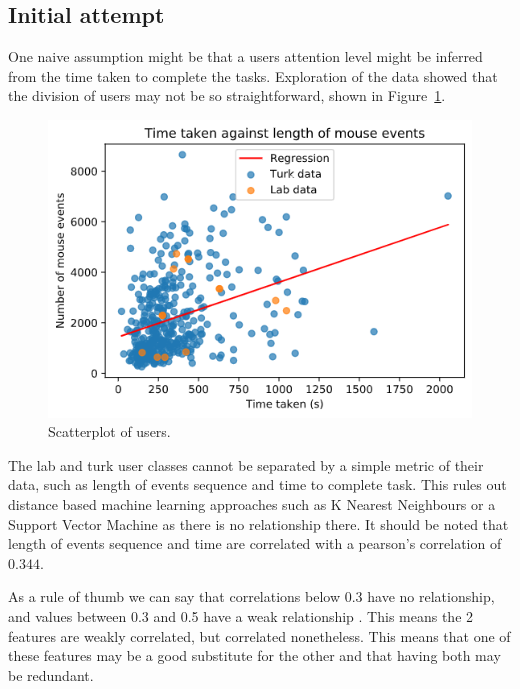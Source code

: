 \documentclass{article}
\begin{document}
\subsection{Initial attempt}

One naive assumption might be that a users attention level might be inferred from the time taken to complete the tasks.
Exploration of the data showed that the division of users may not be so straightforward, shown in Figure~\ref{fig:scatterplot}.

\begin{figure}[ht]
    \centering
    \includegraphics[scale=0.6]{Images/TimeTaken-Mouse-Events.png}
    \caption{Scatterplot of users.}
    \label{fig:scatterplot}
\end{figure}

The lab and turk user classes cannot be separated by a simple metric of their data, such as length of events sequence and time to complete task.
This rules out distance based machine learning approaches such as K Nearest Neighbours or a Support Vector Machine as there is no relationship there.
It should be noted that length of events sequence and time are correlated with a pearson's correlation of $0.344$.

As a rule of thumb we can say that correlations below 0.3 have no relationship, and values between 0.3 and 0.5 have a weak relationship \cite{mindrila2017scatterplots}.
This means the 2 features are weakly correlated, but correlated nonetheless.
This means that one of these features may be a good substitute for the other and that having both may be redundant.
\end{document}
